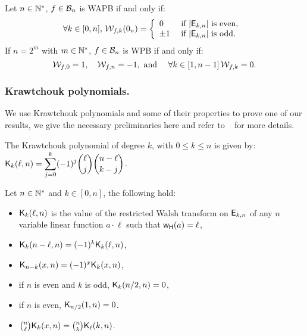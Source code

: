 \documentclass[11pt]{llncs}
\begin{document}
\begin{Prop}\label{prop:WAPBWalsh}

	Let $n\in \mathbb{N}^*$, $f\in \mathcal{B}_{n}$ is WAPB if and only if:
	\[\forall k \in [0,n], \, \mathcal{W}_{f,k}(0_n)=
	\left \{
	\begin{array}{l l}
	0  & \text{ if } |\mathsf{E}_{k,n}| \text{ is even, } \\
	\pm 1 & \text{ if }  |\mathsf{E}_{k,n}| \text{ is odd.}
	\end{array}\right. \]
	If $n=2^m$ with $m\in \mathbb{N}^*$, $f\in \mathcal{B}_{n}$ is WPB if and only if:
	\[\mathcal{W}_{f,0}=1, \quad \mathcal{W}_{f,n}=-1, \text{ and } \quad \forall k \in [1,n-1] \,  \mathcal{W}_{f,k}=0. \]

\end{Prop}


\subsubsection{Krawtchouk polynomials.}
We use Krawtchouk polynomials and some of their properties to prove one of our results, we give the necessary preliminaries here and refer to \eg ~\cite{book:MacSlo78} for more details.

\begin{definition}\label{def:Kraw}
	The Krawtchouk polynomial of degree $k$, with $0\leq k\leq n$ is given by: $ \displaystyle \mathsf{K}_{k}(\ell,n)=\sum_{j=0}^{k} (-1)^j \binom{\ell}{j} \binom{n-\ell}{k-j}$.
\end{definition}





\begin{Prop}\label{prop:Kr}
	Let $n\in \mathbb{N}^*$ and $k\in [0,n]$, the following hold:
\begin{itemize}
	\item $\mathsf{K}_{k}(\ell,n)$ is the value of the restricted Walsh transform on $\mathsf{E}_{k,n}$ of any $n$ variable linear function $a\cdot \ell$ such that $\mathsf{w_H}(a)=\ell$,
	\item $\mathsf{K}_{k}(n-\ell,n)=(-1)^k \mathsf{K}_{k}(\ell,n)$,
	\item $\mathsf{K}_{n-k}(x,n)=(-1)^x \mathsf{K}_{k}(x,n)$,
		\item if $n$ is even and $k$ is odd, $\mathsf{K}_{k}(n/2,n)=0$,
	\item if $n$ is even, $\mathsf{K}_{n/2}(1,n)=0$.
	\item $\binom{n}{\ell}\mathsf{K}_{k}(x,n)=\binom{n}{k}\mathsf{K}_{\ell}(k,n)$.
	\end{itemize}
\end{Prop}
\end{document}

